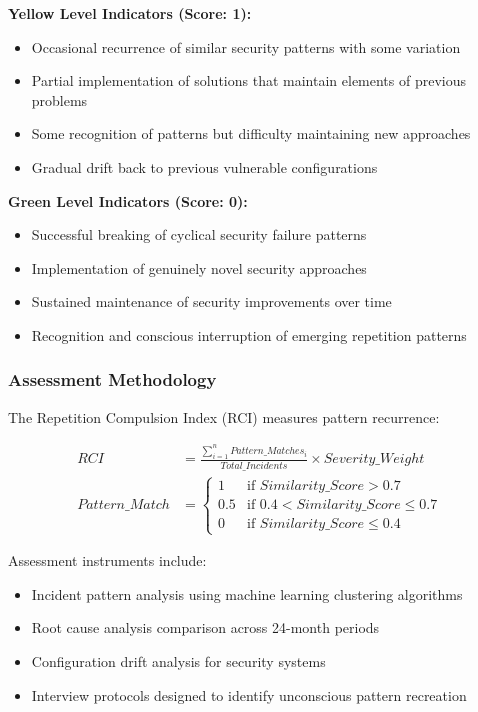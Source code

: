 \documentclass[11pt,a4paper]{article}
\begin{document}
\textbf{Yellow Level Indicators (Score: 1):}
\begin{itemize}
\item Occasional recurrence of similar security patterns with some variation
\item Partial implementation of solutions that maintain elements of previous problems
\item Some recognition of patterns but difficulty maintaining new approaches
\item Gradual drift back to previous vulnerable configurations
\end{itemize}

\textbf{Green Level Indicators (Score: 0):}
\begin{itemize}
\item Successful breaking of cyclical security failure patterns
\item Implementation of genuinely novel security approaches
\item Sustained maintenance of security improvements over time
\item Recognition and conscious interruption of emerging repetition patterns
\end{itemize}

\subsubsection{Assessment Methodology}

The Repetition Compulsion Index (RCI) measures pattern recurrence:

\begin{align}
RCI &= \frac{\sum_{i=1}^{n} Pattern\_Matches_i}{Total\_Incidents} \times Severity\_Weight \\
Pattern\_Match &= \begin{cases} 
1 & \text{if } Similarity\_Score > 0.7 \\
0.5 & \text{if } 0.4 < Similarity\_Score \leq 0.7 \\
0 & \text{if } Similarity\_Score \leq 0.4
\end{cases}
\end{align}

Assessment instruments include:
\begin{itemize}
\item Incident pattern analysis using machine learning clustering algorithms
\item Root cause analysis comparison across 24-month periods
\item Configuration drift analysis for security systems
\item Interview protocols designed to identify unconscious pattern recreation
\end{itemize}
\end{document}
